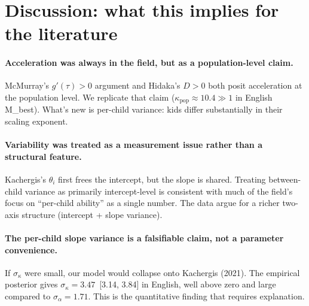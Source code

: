 \documentclass[11pt]{article}
\begin{document}
\section{Discussion: what this implies for the literature}

\paragraph{Acceleration was always in the field, but as a
population-level claim.} McMurray's $g'(\tau) > 0$ argument and
Hidaka's $D > 0$ both posit acceleration at the population level.
We replicate that claim ($\kappa_{\text{pop}} \approx 10.4 \gg 1$
in English M\_best). What's new is per-child variance: kids differ
substantially in their scaling exponent.

\paragraph{Variability was treated as a measurement issue rather
than a structural feature.} Kachergis's $\theta_i$ first frees the
intercept, but the slope is shared. Treating between-child variance
as primarily intercept-level is consistent with much of the field's
focus on ``per-child ability'' as a single number. The data argue
for a richer two-axis structure (intercept + slope variance).

\paragraph{The per-child slope variance is a falsifiable claim, not
a parameter convenience.} If $\sigma_\kappa$ were small, our model
would collapse onto Kachergis (2021). The empirical posterior gives
$\sigma_\kappa = 3.47$ \,[3.14, 3.84] in English, well above zero
and large compared to $\sigma_\alpha = 1.71$. This is the
quantitative finding that requires explanation.
\end{document}
